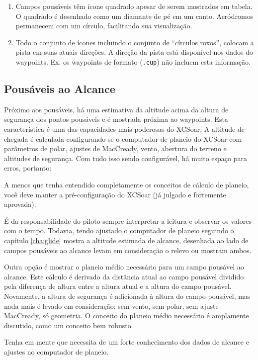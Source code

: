\begin{enumerate}
\item  Campos pousáveis têm ícone quadrado apesar de serem mostrados em tabela.  O quadrado é desenhado como um diamante de pé em um canto.  Aeródromos permanecem com um círculo, facilitando sua visualização. 
\item  Todo o conjunto de ícones incluindo o conjunto de “círculos roxos”, colocam a pista em suas atuais direções.  A direção da pista está disponível nos dados do waypoints.  Ex. os waypoints de formato (\verb|.cup|) não incluem esta informação.
\end{enumerate}

\subsection*{Pousáveis ao Alcance}
Próximo aos pousáveis, há uma estimativa da altitude acima da altura de segurança dos 
pontos pousáveis e é mostrada próxima ao waypoints.  Esta característica é uma das 
capacidades mais poderosas do XCSoar.  A altitude de chegada é calculada configurando-se 
o computador de planeio do XCSoar com parâmetros de polar, ajustes de MacCready, vento, 
abertura do terreno e altitudes de segurança.  Com tudo isso sendo configurável, há muito 
espaço para erros, portanto:

A menos que tenha entendido completamente os conceitos de cálculo de planeio, você deve 
\warning manter a pré-configuração do XCSoar (já julgado e fortemente aprovada).

É da responsabilidade do piloto sempre interpretar a leitura e observar os valores com o 
tempo.  Todavia, tendo ajustado o computador de planeio seguindo o capítulo 
\ref{cha:glide} mostra a altitude estimada de alcance, desenhada ao lado de campos pousáveis ao alcance levam em consideração o relevo ou mostram ambos.

Outra opção é mostrar o planeio médio necessário para um campo pousável ao alcance.  Este cálculo é derivado da distância atual ao campo pousável dividido pela diferença de altura entre a altura atual e a altura do campo pousável.  Novamente, a altura de segurança é adicionada à altura do campo pousável, mas nada mais é levado em consideração: sem vento, sem polar, sem ajuste MacCready, só geometria.  O conceito do planeio médio necessário é amplamente discutido, como um conceito bem robusto.

\tip Tenha em mente que necessita de um forte conhecimento dos dados de alcance e ajustes no computador de planeio.

